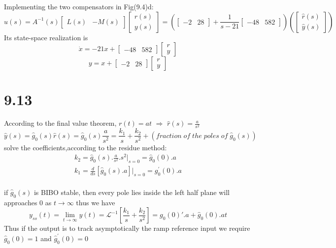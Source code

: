 \documentclass{article}
\begin{document}
Implementing the two compensators in Fig(9.4)d:
\[
\hat{u}(s)=A^{-1}(s)
\left[
    \begin{array}{cc}
    L(s)& -M(s)
    \end{array}
\right]
\left[
    \begin{array}{c}
        r(s)\\
        y(s)
    \end{array}
\right]=
(
\left[
    \begin{array}{cc}
        -2 & 28
    \end{array}
\right]+
\frac{1}{s-21}\left[
    \begin{array}{cc}
        -48 & 582
    \end{array}
\right]
)(\left[
    \begin{array}{c}
        \hat{r}(s)\\
        \hat{y}(s)
    \end{array}
\right])
\]
Its state-space realization is 
\[
\dot{x}=-21x+\left[
    \begin{array}{cc}
        -48 & 582
    \end{array}
\right]\left[
    \begin{array}{c}
        r\\
        y
    \end{array}
\right]
\]
\[ 
y=x+\left[
    \begin{array}{cc}
        -2 & 28
    \end{array}
\right]
\left[
    \begin{array}{c}
        r\\
        y
    \end{array}
\right]
\]

\section*{9.13}
According to the final value theorem,
$r(t)=at$ $\Rightarrow$ $\hat{r}(s)=\frac{a}{s^2}$
\[
\hat{y}(s)=\hat{g}_0(s)\hat{r}(s)=\hat{g}_0(s)\frac{a}{s^2}=
\frac{k_1}{s}+\frac{k_2}{s^2}+(fraction\; of\; the\; poles\; of\; \hat{g}_0(s))
\]
solve the coefficients,according to the residue method:
\[
\begin{split}
k_2=\hat{g}_0(s).\frac{a}{s^2}.s^2 \Bigg|_{s=0}=\hat{g}_0(0).a\\
k_1=\frac{d}{ds}[\hat{g}_0(s).a] \Bigg|_{s=0}=g^{'}_0(0).a\\  
\end{split}  
\]

if $\hat{g}_0(s)$ is BIBO stable, then every pole lies inside the left half plane will approaches 0 as $t\rightarrow \infty$
thus we have 
\[y_{ss}(t)=\lim_{t \rightarrow \infty}y(t)=\mathcal{L}^{-1}[\frac{k_1}{s}+\frac{k_2}{s^2}]=g_0(0)'.a+\hat{g}_0(0).at\]
Thus if the output is to track asymptotically the ramp reference input we require $\hat{g}_0(0)=1$ and $\hat{g}^{'}_0(0)=0$
\end{document}
